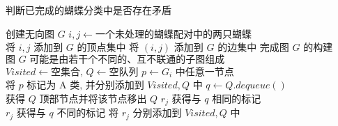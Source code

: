 \documentclass[11pt]{article}
\begin{document}
\begin{CJK*}{UTF8}{gkai}
  \begin{algorithm}
    \caption{判断已完成的蝴蝶分类中是否存在矛盾}
    \begin{algorithmic}[1]
      \State $\text{创建无向图 }G$
        \State $i,j \gets \text{一个未处理的蝴蝶配对中的两只蝴蝶}$
        \State $\text{将 } i,j \text{ 添加到 } G \text{ 的顶点集中}$
        \State $\text{将 } (i,j) \text{ 添加到 } G \text{ 的边集中}$
      \EndWhile \Comment $\text{完成图 } G \text{ 的构建}$
       \Comment $\text{图 } G \text{ 可能是由若干个不同的、互不联通的子图组成 }$
        \State $Visited \gets \text{空集合, } Q \gets \text{空队列}$
        \State $p \gets G_i \text{ 中任意一节点 }$
        \State $\text{将 } p \text{ 标记为 A 类, 并分别添加到 } Visited,Q \text{ 中}$
          \State $q \gets Q.dequeue()$ \Comment $\text{获得 } Q \text{ 顶部节点并将该节点移出 } Q$
                \State $r_j \text{ 获得与 } q \text{ 相同的标记}$
              \Else
                \State $r_j \text{ 获得与 } q \text{ 不同的标记}$
              \EndIf
            \EndIf
              \State $\text{将 } r_j \text{ 分别添加到 } Visited,Q \text{ 中}$
            \EndIf
          \EndFor
        \EndWhile \Comment {}
            \State \Return {}
            \State \Return {} 
          \EndIf
        \EndFor
      \EndFor
      \State \Return {}
    \end{algorithmic}
  \end{algorithm}
\end{CJK*}
\end{document}
